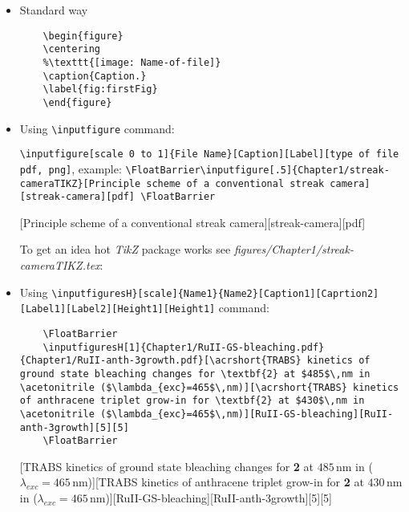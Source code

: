 \begin{itemize}
	\item Standard way
	\begin{lstlisting}
	\begin{figure}
	\centering
	%\texttt{[image: Name-of-file]}
	\caption{Caption.}
	\label{fig:firstFig}
	\end{figure}
	\end{lstlisting}
	
	\item Using \lstinline|\inputfigure| command:
	
	\lstinline|\inputfigure[scale 0 to 1]{File Name}[Caption][Label][type of file pdf, png]|, example: \lstinline|\FloatBarrier\inputfigure[.5]{Chapter1/streak-cameraTIKZ}[Principle scheme of a conventional streak camera][streak-camera][pdf] \FloatBarrier|
	
	\FloatBarrier
	[Principle scheme of a conventional streak camera][streak-camera][pdf]
	\FloatBarrier
	
	
	To get an idea hot \textit{TikZ} package works see \textit{figures/Chapter1/streak-cameraTIKZ.tex}:
	
	
	
	\item Using \lstinline|\inputfiguresH}[scale]{Name1}{Name2}[Caption1][Caprtion2][Label1][Label2][Height1][Height1]| command:
	
	
	
	\begin{lstlisting}
	\FloatBarrier
	\inputfiguresH[1]{Chapter1/RuII-GS-bleaching.pdf}{Chapter1/RuII-anth-3growth.pdf}[\acrshort{TRABS} kinetics of ground state bleaching changes for \textbf{2} at $485$\,nm in \acetonitrile ($\lambda_{exc}=465$\,nm)][\acrshort{TRABS} kinetics of anthracene triplet grow-in for \textbf{2} at $430$\,nm in \acetonitrile ($\lambda_{exc}=465$\,nm)][RuII-GS-bleaching][RuII-anth-3growth][5][5]
	\FloatBarrier
	\end{lstlisting}
	
	
	\FloatBarrier
	[\acrshort{TRABS} kinetics of ground state bleaching changes for \textbf{2} at $485$\,nm in \acetonitrile ($\lambda_{exc}=465$\,nm)][\acrshort{TRABS} kinetics of anthracene triplet grow-in for \textbf{2} at $430$\,nm in \acetonitrile ($\lambda_{exc}=465$\,nm)][RuII-GS-bleaching][RuII-anth-3growth][5][5]
	\FloatBarrier
	
	
\end{itemize}



